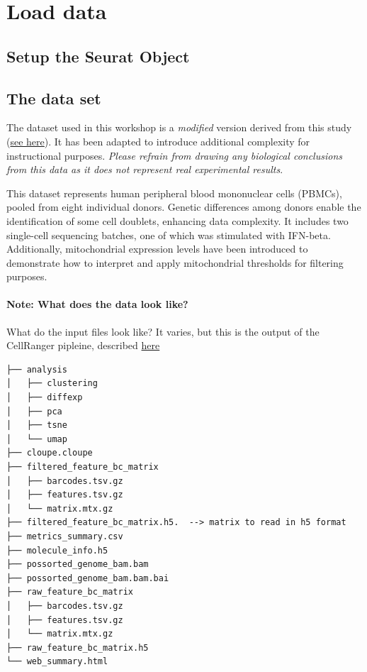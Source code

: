\documentclass[
]{book}
\begin{document}
\hypertarget{load}{%
\chapter{Load data}\label{load}}

\hypertarget{setup-the-seurat-object}{%
\section{Setup the Seurat Object}\label{setup-the-seurat-object}}

\hypertarget{the-data-set}{%
\section{The data set}\label{the-data-set}}

The dataset used in this workshop is a \emph{modified} version derived from this study (\href{https://pubmed.ncbi.nlm.nih.gov/29227470/}{see here}). It has been adapted to introduce additional complexity for instructional purposes. \emph{Please refrain from drawing any biological conclusions from this data as it does not represent real experimental results}.

This dataset represents human peripheral blood mononuclear cells (PBMCs), pooled from eight individual donors. Genetic differences among donors enable the identification of some cell doublets, enhancing data complexity. It includes two single-cell sequencing batches, one of which was stimulated with IFN-beta. Additionally, mitochondrial expression levels have been introduced to demonstrate how to interpret and apply mitochondrial thresholds for filtering purposes.

\hypertarget{note-what-does-the-data-look-like}{%
\subsubsection*{Note: What does the data look like?}\label{note-what-does-the-data-look-like}}

What do the input files look like? It varies, but this is the output of the CellRanger pipleine, described \href{https://support.10xgenomics.com/single-cell-gene-expression/software/pipelines/latest/output/gex-outputs}{here}

\begin{verbatim}
├── analysis
│   ├── clustering
│   ├── diffexp
│   ├── pca
│   ├── tsne
│   └── umap
├── cloupe.cloupe
├── filtered_feature_bc_matrix
│   ├── barcodes.tsv.gz
│   ├── features.tsv.gz
│   └── matrix.mtx.gz
├── filtered_feature_bc_matrix.h5.  --> matrix to read in h5 format
├── metrics_summary.csv
├── molecule_info.h5
├── possorted_genome_bam.bam
├── possorted_genome_bam.bam.bai
├── raw_feature_bc_matrix
│   ├── barcodes.tsv.gz
│   ├── features.tsv.gz
│   └── matrix.mtx.gz
├── raw_feature_bc_matrix.h5 
└── web_summary.html
\end{verbatim}
\end{document}
